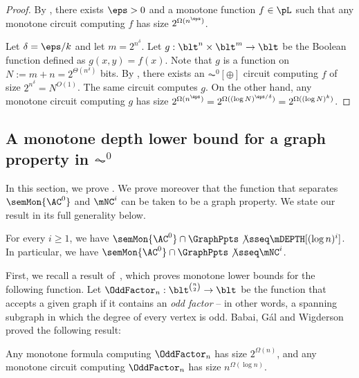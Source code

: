 \documentclass[11pt]{article}
\begin{document}
\acxormp*
\begin{proof}
    By , there exists $\eps > 0$ and 
    a monotone function $f \in \pL$
    such that any monotone circuit computing $f$ has size
    $2^{\Omega(n^\eps)}$.

    Let $\delta = \eps/k$ and let $m = 2^{n^{\delta}}$.
    Let $g : \blt^{n} \times \blt^{m} \to \blt$
    be the Boolean function defined as
    $g(x,y) = f(x)$.
    Note that $g$ is a function on $N := m + n = 2^{\Theta(n^{\delta})}$
    bits.
    By ,
    there exists an $\AC^0[\oplus]$ circuit computing
    $f$ of size $2^{n^{\delta}} = N^{O(1)}$. The same circuit computes $g$.
    On the other hand, any monotone circuit computing $g$
    has size
    $2^{\Omega(n^\eps)} = 2^{\Omega((\log N)^{\eps / \delta})} =
    2^{\Omega((\log N)^k)}$.
\end{proof}

\subsection{A monotone depth lower bound for a graph property in $\AC^0$}
\label{s:padding_graph}

In this section,
we prove 
.
We prove moreover that the function that separates $\semMon{\AC^0}$ and
$\mNC^i$ can be taken to be a graph property.
We state our result in its full generality below.

\begin{theorem}
    \label{thm:ac0-fml-graph}
    For every $i \geq 1$,
    we have
    $\semMon{\AC^0} \cap \GraphPpts \not\sseq \mDEPTH[(\log n)^i]$.
    In particular, we have
    $\semMon{\AC^0} \cap \GraphPpts \not\sseq \mNC^i$.
\end{theorem}


First, we recall a result
of~\cite{DBLP:journals/combinatorica/BabaiGW99},
which proves monotone lower bounds for the following function.
Let 
$\OddFactor_n : \blt^{\binom{n}{2}} \to \blt$
be the function that accepts a given 
graph
if 
it
contains an \emph{odd factor} -- in other words,
a spanning subgraph in which the degree of every vertex is odd.
Babai, Gál and Wigderson~\cite{DBLP:journals/combinatorica/BabaiGW99}
proved
the following result:
\begin{theorem}
    \label{thm:bip-oddfactor-lb}
        Any monotone formula computing 
        $\OddFactor_n$ 
        has size $2^{\Omega(n)}$,
        and any monotone circuit computing
        $\OddFactor_n$ 
        has size $n^{\Omega(\log n)}$.
\end{theorem}
\end{document}
